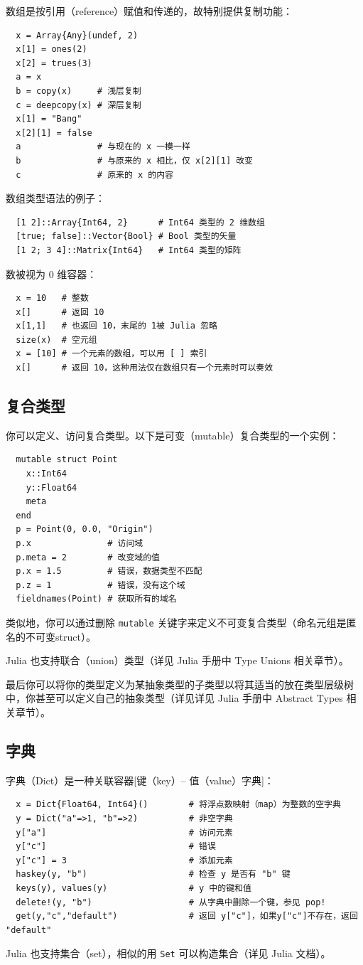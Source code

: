 \documentclass[10pt,a4paper]{article}
\begin{document}
数组是按引用（reference）赋值和传递的，故特别提供复制功能：
\begin{lstlisting}
  x = Array{Any}(undef, 2)
  x[1] = ones(2)
  x[2] = trues(3)
  a = x
  b = copy(x)     # 浅层复制
  c = deepcopy(x) # 深层复制
  x[1] = "Bang"
  x[2][1] = false
  a               # 与现在的 x 一模一样
  b               # 与原来的 x 相比，仅 x[2][1] 改变
  c               # 原来的 x 的内容
\end{lstlisting}

数组类型语法的例子：
\begin{lstlisting}
  [1 2]::Array{Int64, 2}      # Int64 类型的 2 维数组
  [true; false]::Vector{Bool} # Bool 类型的矢量
  [1 2; 3 4]::Matrix{Int64}   # Int64 类型的矩阵
\end{lstlisting}

数被视为 0 维容器：
\begin{lstlisting}
  x = 10   # 整数
  x[]      # 返回 10
  x[1,1]   # 也返回 10，末尾的 1被 Julia 忽略
  size(x)  # 空元组
  x = [10] # 一个元素的数组，可以用 [ ] 索引
  x[]      # 返回 10，这种用法仅在数组只有一个元素时可以奏效
\end{lstlisting}

\subsection{复合类型}
你可以定义、访问复合类型。以下是可变（mutable）复合类型的一个实例：
\begin{lstlisting}
  mutable struct Point
    x::Int64
    y::Float64
    meta
  end
  p = Point(0, 0.0, "Origin")
  p.x               # 访问域
  p.meta = 2        # 改变域的值
  p.x = 1.5         # 错误，数据类型不匹配
  p.z = 1           # 错误，没有这个域
  fieldnames(Point) # 获取所有的域名
\end{lstlisting}

类似地，你可以通过删除 \lstinline|mutable| 关键字来定义不可变复合类型（命名元组是匿名的不可变struct）。 

Julia 也支持联合（union）类型（详见 Julia 手册中 Type Unions 相关章节）。

最后你可以将你的类型定义为某抽象类型的子类型以将其适当的放在类型层级树中，你甚至可以定义自己的抽象类型（详见详见 Julia 手册中 Abstract Types 相关章节）。

\subsection{字典}
字典（Dict）是一种关联容器[键（key）-- 值（value）字典]：
\begin{lstlisting}
  x = Dict{Float64, Int64}()        # 将浮点数映射（map）为整数的空字典
  y = Dict("a"=>1, "b"=>2)          # 非空字典
  y["a"]                            # 访问元素
  y["c"]                            # 错误
  y["c"] = 3                        # 添加元素
  haskey(y, "b")                    # 检查 y 是否有 "b" 键
  keys(y), values(y)                # y 中的键和值
  delete!(y, "b")                   # 从字典中删除一个键，参见 pop!
  get(y,"c","default")              # 返回 y["c"]，如果y["c"]不存在，返回 "default"
\end{lstlisting}
Julia 也支持集合（set），相似的用 \lstinline|Set| 可以构造集合（详见 Julia 文档）。
\end{document}
